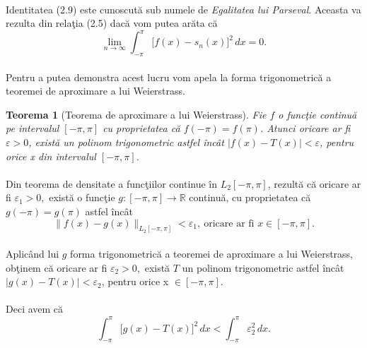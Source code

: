 \documentclass[a4paper,openany,12pt]{report}
\newtheorem{theorem}{Teorema}[section]
\begin{document}
\paragraph*{} Identitatea (2.9) este cunoscut\u a sub numele de \textit{Egalitatea lui Parseval}. Aceasta va rezulta din rela\c tia (2.5) dac\u a vom putea ar\u ata c\u a
\begin{equation}
\lim_{n\to \infty} {\int_{-\pi}^{\pi} \Big[f(x) - s_n(x)\Big]^2\,dx} = 0.
\end{equation}
\paragraph*{}Pentru a putea demonstra acest lucru vom apela la forma trigonometric\u a a teoremei de aproximare a lui Weierstrass.
\begin{theorem} [Teorema de aproximare a lui Weierstrass]
Fie $f$ o func\c tie continu\u a pe intervalul $[-\pi, \pi]$ cu proprietatea c\u a $f(-\pi) = f(\pi)$. Atunci oricare ar fi $\varepsilon > 0$, exist\u a un polinom trigonometric astfel \^ inc\^ at $\left | f(x) - T(x) \right | < \varepsilon$, pentru orice x din intervalul $[-\pi, \pi]$.
\end{theorem}
\paragraph*{}Din teorema de densitate a func\c tiilor continue \^ in $L_2[-\pi, \pi]$, rezult\u a c\u a oricare ar fi $ \varepsilon_1 > 0, $ exist\u a o func\c tie $g : [-\pi, \pi] \rightarrow \mathbb{R}$ continu\u a, cu proprietatea c\u a $g(-\pi) = g(\pi)$ astfel \^ inc\^ at
\begin{equation*}
\|f(x) - g(x)\|_{L_2[-\pi, \pi]} < \varepsilon_1, \: \text{oricare ar fi } x \in [-\pi, \pi].
\end{equation*}
\paragraph*{}Aplic\^ and lui $g$ forma trigonometric\u a a teoremei de aproximare a lui Weierstrass, ob\c tinem c\u a oricare ar fi $ \varepsilon_2 > 0,$ exist\u a $T$ un polinom trigonometric astfel \^ inc\^ at  $\left | g(x) - T(x) \right | < \varepsilon_2$, pentru orice x $\in [-\pi, \pi]$.
\paragraph*{}Deci avem c\u a
\begin{equation}
\int_{-\pi}^{\pi} \Big[g(x) - T(x)\Big]^2\,dx < \int_{-\pi}^{\pi} \varepsilon_2^2\, dx.
\end{equation}
\end{document}
